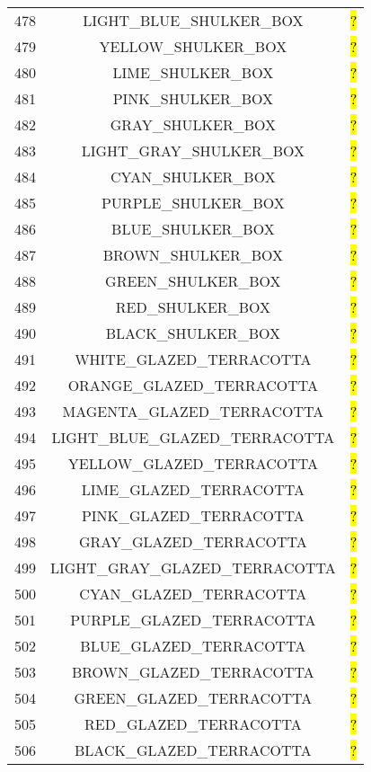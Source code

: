 \documentclass[11pt]{article}
\newcommand\myworries[1]{\sethlcolor{red}\hl{#1}}
\begin{document}
\begin{longtable}{ |c|c|c| }
	478 & LIGHT\_BLUE\_SHULKER\_BOX & \myworries{?} \\
	479 & YELLOW\_SHULKER\_BOX & \myworries{?} \\
	480 & LIME\_SHULKER\_BOX & \myworries{?} \\
	481 & PINK\_SHULKER\_BOX & \myworries{?} \\
	482 & GRAY\_SHULKER\_BOX & \myworries{?} \\
	483 & LIGHT\_GRAY\_SHULKER\_BOX & \myworries{?} \\
	484 & CYAN\_SHULKER\_BOX & \myworries{?} \\
	485 & PURPLE\_SHULKER\_BOX & \myworries{?} \\
	486 & BLUE\_SHULKER\_BOX & \myworries{?} \\
	487 & BROWN\_SHULKER\_BOX & \myworries{?} \\
	488 & GREEN\_SHULKER\_BOX & \myworries{?} \\
	489 & RED\_SHULKER\_BOX & \myworries{?} \\
	490 & BLACK\_SHULKER\_BOX & \myworries{?} \\
	491 & WHITE\_GLAZED\_TERRACOTTA & \myworries{?} \\
	492 & ORANGE\_GLAZED\_TERRACOTTA & \myworries{?} \\
	493 & MAGENTA\_GLAZED\_TERRACOTTA & \myworries{?} \\
	494 & LIGHT\_BLUE\_GLAZED\_TERRACOTTA & \myworries{?} \\
	495 & YELLOW\_GLAZED\_TERRACOTTA & \myworries{?} \\
	496 & LIME\_GLAZED\_TERRACOTTA & \myworries{?} \\
	497 & PINK\_GLAZED\_TERRACOTTA & \myworries{?} \\
	498 & GRAY\_GLAZED\_TERRACOTTA & \myworries{?} \\
	499 & LIGHT\_GRAY\_GLAZED\_TERRACOTTA & \myworries{?} \\
	500 & CYAN\_GLAZED\_TERRACOTTA & \myworries{?} \\
	501 & PURPLE\_GLAZED\_TERRACOTTA & \myworries{?} \\
	502 & BLUE\_GLAZED\_TERRACOTTA & \myworries{?} \\
	503 & BROWN\_GLAZED\_TERRACOTTA & \myworries{?} \\
	504 & GREEN\_GLAZED\_TERRACOTTA & \myworries{?} \\
	505 & RED\_GLAZED\_TERRACOTTA & \myworries{?} \\
	506 & BLACK\_GLAZED\_TERRACOTTA & \myworries{?} \\

\end{longtable}
\end{document}
